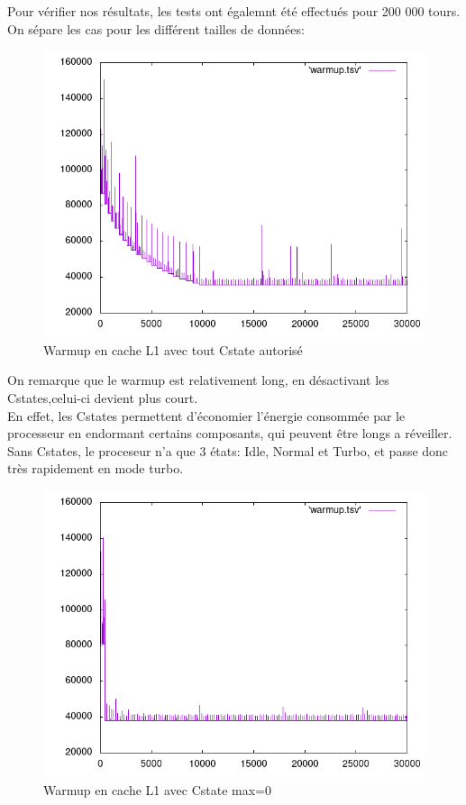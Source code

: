 \documentclass{report}
\begin{document}
Pour vérifier nos résultats, les tests ont égalemnt été effectués pour 200 000 tours.
On sépare les cas pour les différent tailles de données:
\newpage
    \begin{figure}[ht!]
        \centering
        \includegraphics[width=120mm]{MEDIA/warmupL1_Cstate.png}
        \caption{Warmup en cache L1 avec tout Cstate autorisé}
    \end{figure}

On remarque que le warmup est relativement long, en désactivant les Cstates,celui-ci devient plus court.\\

En effet, les Cstates permettent d'économier l'énergie consommée par le processeur en endormant certains composants, qui peuvent être longs a réveiller.\\

Sans Cstates, le proceseur n'a que 3 états: Idle, Normal et Turbo, et passe donc très rapidement en mode turbo.\\
\newpage
    \begin{figure}[ht!]
        \centering
        \includegraphics[width=120mm]{MEDIA/warmupL1_NOCstate.png}
        \caption{Warmup en cache L1 avec Cstate max=0}
    \end{figure}
\end{document}
